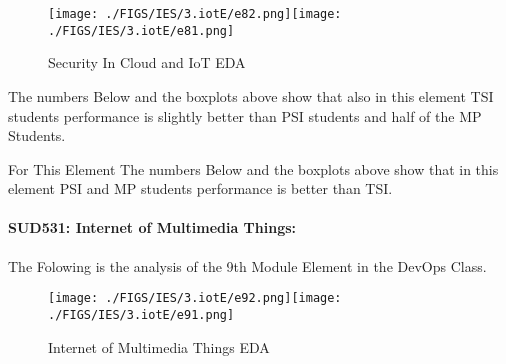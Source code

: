 \documentclass[12pt]{extreport}
\begin{document}
\begin{figure}[H]
	\centering
	\texttt{[image: ./FIGS/IES/3.iotE/e82.png]}\texttt{[image: ./FIGS/IES/3.iotE/e81.png]}
	\caption{Security In Cloud and IoT EDA}
	\label{fig:37}
\end{figure}



\begin{comment}


\begin{enumerate}	
	\item The MP Class Box-Plot:
	\begin{enumerate}
		\item MAX = a {} {} {} {} {} {} {} {} UQ = b {} {} {} {} {} {} {} {} Median = c
		\item LQ = d {} {} {} {} {} {} {} {}  MIN =	l {} {} {} {} {} {} {} {}  IQR = e - f = g
	\end{enumerate}
	\item The PSI Class Box-Plot:
	\begin{enumerate}
		\item MAX = a {} {} {} {} {} {} {} {} UQ = b {} {} {} {} {} {} {} {} Median = c
		\item LQ = d {} {} {} {} {} {} {} {}  MIN =	e {} {} {} {} {} {} {} {} IQR = f - g = h	
	\end{enumerate}
	\item The TSI Class Box-Plot:
	\begin{enumerate}
		\item MAX = a {} {} {} {} {} {} {} {} UQ = b {} {} {} {} {} {} {} {} Median = c
		\item LQ = d {} {} {} {} {} {} {} {} MIN = e {} {} {} {} {} {} {} {} IQR = f - g = h	
	\end{enumerate}
\end{enumerate}
\end{comment}




The numbers Below and the boxplots above show that also in this element  TSI students performance is slightly better than PSI students and half of the MP Students.

For This Element The numbers Below and the boxplots above show that in this element  PSI and MP students performance is  better than TSI.




\paragraph{\large SUD531: Internet of Multimedia Things:\\
} 
The Folowing is the analysis of the 9th Module Element in the DevOps Class.
\begin{figure}[H]
	\centering
	\texttt{[image: ./FIGS/IES/3.iotE/e92.png]}\texttt{[image: ./FIGS/IES/3.iotE/e91.png]}
	\caption{Internet of Multimedia Things EDA}
	\label{fig:38}
\end{figure}
\end{document}
